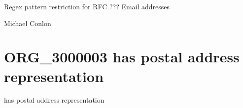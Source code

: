 \documentclass[letterpaper,10pt,english]{sphinxmanual}
\begin{document}
\begin{sphinxShadowBox}

\sphinxAtStartPar
{\hyperref[\detokenize{doc-IAO_0000429::doc}]{}}
\end{sphinxShadowBox}

\begin{sphinxShadowBox}

\sphinxAtStartPar
{}
\end{sphinxShadowBox}

\begin{sphinxShadowBox}

\sphinxAtStartPar
{}
\end{sphinxShadowBox}

\begin{sphinxShadowBox}

\sphinxAtStartPar
Regex pattern restriction for RFC ??? Email addresses
\end{sphinxShadowBox}

\begin{sphinxShadowBox}

\sphinxAtStartPar
Michael Conlon 
\end{sphinxShadowBox}
\begin{quote}

\ignorespaces \end{quote}


\section{ORG\_3000003 \sphinxhyphen{} has postal address representation}
\label{\detokenize{doc-ORG_3000003:org-3000003-has-postal-address-representation}}\label{\detokenize{doc-ORG_3000003:index-0}}\label{\detokenize{doc-ORG_3000003::doc}}
\begin{sphinxShadowBox}

\sphinxAtStartPar
has postal address representation
\end{sphinxShadowBox}
\end{document}
